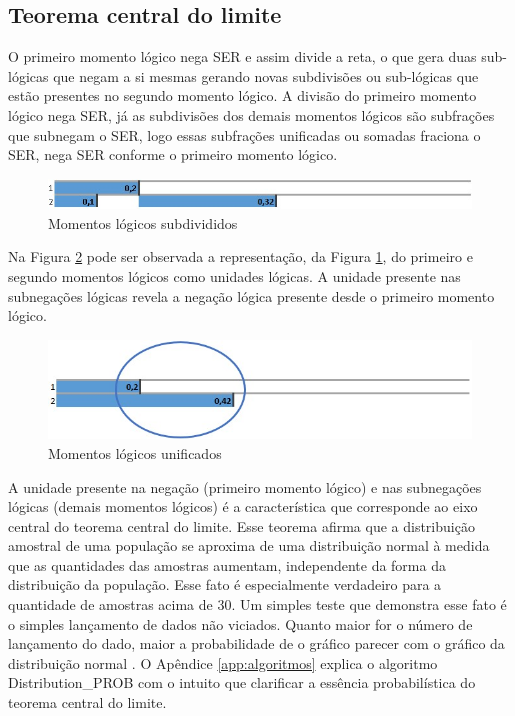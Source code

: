 \subsection{Teorema central do limite}
O primeiro momento lógico nega SER e assim divide a reta, o que gera duas sub-lógicas que negam a si mesmas gerando novas subdivisões ou sub-lógicas que estão presentes no segundo momento lógico. A divisão do primeiro momento lógico nega SER, já as subdivisões dos demais momentos lógicos são subfrações que subnegam o SER, logo essas subfrações unificadas ou somadas fraciona o SER, nega SER conforme o primeiro momento lógico. 
\begin{figure}[H]
\caption{Momentos lógicos subdivididos}
\label{fig:second_logical_moment}
\centering
\includegraphics[scale=.85]{sections/images/second_logical_moment.jpg}
\end{figure}

Na Figura \ref{fig:logical_units} pode ser observada a representação, da Figura \ref{fig:second_logical_moment}, do primeiro e segundo momentos lógicos como unidades lógicas. A unidade presente nas subnegações lógicas revela a negação lógica presente desde o primeiro momento lógico.
\begin{figure}[H]
\caption{Momentos lógicos unificados}
\label{fig:logical_units}
\centering
\includegraphics[scale=.85]{sections/images/logical_units.jpg}
\end{figure}

A unidade presente na negação (primeiro momento lógico) e nas subnegações lógicas (demais momentos lógicos) é a característica que corresponde ao eixo central do teorema central do limite. Esse teorema afirma que a distribuição amostral de uma população se aproxima de uma distribuição normal à medida que as quantidades das amostras aumentam, independente da forma da distribuição da população. Esse fato é especialmente verdadeiro para a quantidade de amostras acima de 30. Um simples teste que demonstra esse fato é o simples lançamento de dados não viciados. Quanto maior for o número de lançamento do dado, maior a probabilidade de o gráfico parecer com o gráfico da distribuição normal \cite{statisticshowto_teorema_central_limite}. O Apêndice \ref{app:algoritmos} explica o algoritmo Distribution\_PROB com o intuito que clarificar a essência probabilística do teorema central do limite. 

